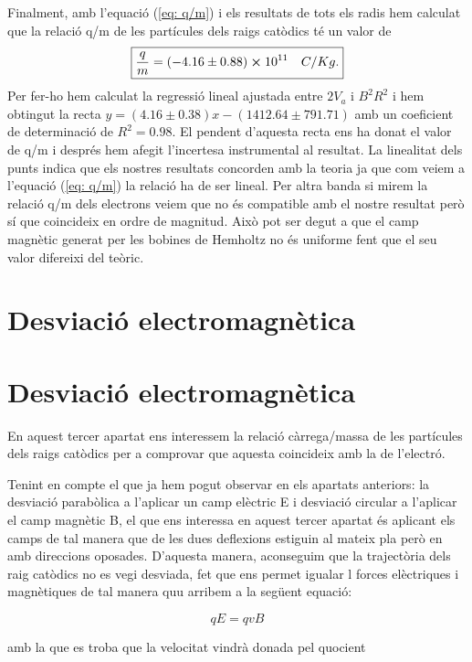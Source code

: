 \documentclass[11pt]{article}
\begin{document}
Finalment, amb l'equació (\ref{eq: q/m}) i els resultats de tots els radis hem calculat que la relació q/m de les partícules dels raigs catòdics té un valor de 
\[
\boxed{\frac{q}{m}=(-4.16\pm0.88)\cross10^{11}\quad C/Kg.}
\]
Per fer-ho hem calculat la regressió lineal ajustada entre $2V_a$ i $B^2R^2$ i hem obtingut la recta $y=(4.16\pm0.38)x - (1412.64\pm791.71)$ amb un coeficient de determinació de $R^2=0.98$. El pendent d'aquesta recta ens ha donat el valor de q/m i després hem afegit l'incertesa instrumental al resultat. La linealitat dels punts indica que els nostres resultats concorden amb la teoria ja que com veiem a l'equació (\ref{eq: q/m}) la relació ha de ser lineal. Per altra banda si mirem la relació q/m dels electrons veiem que no és compatible amb el nostre resultat però sí que coincideix en ordre de magnitud. Això pot ser degut a que el camp magnètic generat per les bobines de Hemholtz no és uniforme fent que el seu valor difereixi del teòric.


\section{Desviació electromagnètica}\label{sec: desv_em}

\section{Desviació electromagnètica}\label{sec: desv_em}

En aquest tercer apartat ens interessem la relació càrrega/massa de les partícules dels raigs catòdics per a comprovar que aquesta coincideix amb la de l'electró. 

Tenint en compte el que ja hem pogut observar en els apartats anteriors: la desviació parabòlica a l'aplicar un camp elèctric E i desviació circular a l'aplicar el camp magnètic B, el que ens interessa en aquest tercer apartat és aplicant els camps de tal manera que de les dues deflexions estiguin al mateix pla però en amb direccions oposades. D'aquesta manera, aconseguim que la trajectòria dels raig catòdics no es vegi desviada, fet que ens permet igualar l forces elèctriques i magnètiques de tal manera quu arribem a la següent equació:

\begin{equation}\label{eq: Fm=Fe}
    qE = qvB
\end{equation}

amb la que es troba que la velocitat vindrà donada pel quocient
\end{document}
